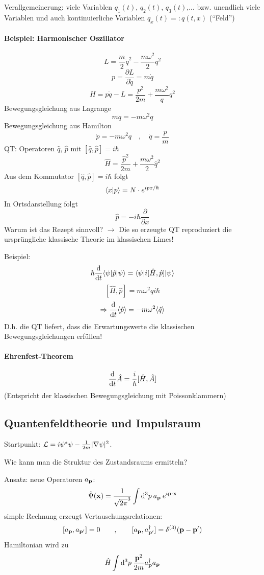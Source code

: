 \documentclass[11pt,a4paper]{report}
\begin{document}
Verallgemeinerung: viele Variablen $q_1(t)$, $q_2(t)$, $q_3(t)$,... bzw. unendlich viele Variablen und auch kontinuierliche Variablen $q_x(t)=: q(t,x)$ (``Feld'')

\paragraph{Beispiel: Harmonischer Oszillator}

$$L=\frac{m}{2}\dot{q}^2 - \frac{m\omega^2}{2}q^2$$
$$p = \frac{\partial L}{\partial \dot{q}} = m\dot{q}$$
$$H=p\dot{q} -L = \frac{p^2}{2m}+\frac{m\omega^2}{q}q^2$$
Bewegungsgleichung aus Lagrange
$$m\ddot{q}=-m\omega^2q$$
Bewegungsgleichung aus Hamilton
$$\dot{p}=-m\omega^2q\quad , \quad \dot{q}=\frac{p}{m}$$
QT: Operatoren $\hat{q}$, $\hat{p}$ mit $[\hat{q},\hat{p}]=i\hbar$
$$\hat{H}=\frac{\hat{p}^2}{2m}+\frac{m\omega^2}{2}\hat{q}^2$$
Aus dem Kommutator $[\hat{q},\hat{p}]=i\hbar$ folgt
$$\langle x | p \rangle=N\cdot e^{ipx/\hbar }$$
In Ortsdarstellung folgt
$$\hat{p}=-i\hbar\frac{\partial}{\partial x}$$
Warum ist das Rezept sinnvoll? $\rightarrow$ Die so erzeugte QT reproduziert die ursprüngliche klassische Theorie im klassischen Limes!\par 

Beispiel:
$$\hbar\frac{\mathrm{d}}{\mathrm{d} t}\langle \psi|\hat{p}|\psi\rangle=\langle \psi|i[\hat{H},\hat{p}]|\psi\rangle$$
$$[\hat{H},\hat{p}]=m\omega^2\hat{q}i\hbar$$
$$\Rightarrow \frac{\mathrm{d}}{\mathrm{d} t}\langle \hat{p}\rangle = -m\omega^2\langle \hat{q}\rangle$$
D.h. die QT liefert, dass die Erwartungswerte die klassischen Bewegungsgleichungen erfüllen!\par 

\paragraph{Ehrenfest-Theorem}
$$\frac{\mathrm{d}}{\mathrm{d} t}\hat{A}=\frac{i}{\hbar}[\hat{H},\hat{A}]$$
(Entspricht der klassischen Bewegungsgleichung mit Poissonklammern)

\subsection{Quantenfeldtheorie und Impulsraum}

Startpunkt: $\mathcal{L} = i\psi^*\psi - \frac{1}{2m}|\nabla\psi |^2$.\par 

Wie kann man die Struktur des Zustandsraums ermitteln?\par 
Ansatz: neue Operatoren $a_{\mathbf{p}}$:
$$\hat{\Psi} (\mathbf{x})=\frac{1}{\sqrt{2\pi}^3}\int \mathrm{d}^3p \: a_{\mathbf{p}} \: e^{i\mathbf{p}\cdot\mathbf{x}}$$
simple Rechnung erzeugt Vertauschungsrelationen:
$$[a_{\mathbf{p}},a_{\mathbf{p}'}]=0\qquad ,\qquad [a_{\mathbf{p}},a^\dagger_{\mathbf{p}'}]=\delta^{(3)}(\mathbf{p}-\mathbf{p}')$$
Hamiltonian wird zu
$$\hat{H}\int\mathrm{d}^3p\:\frac{\mathbf{p}^2}{2m}a_{\mathbf{p}}^\dagger a_{\mathbf{p}}$$
\end{document}
